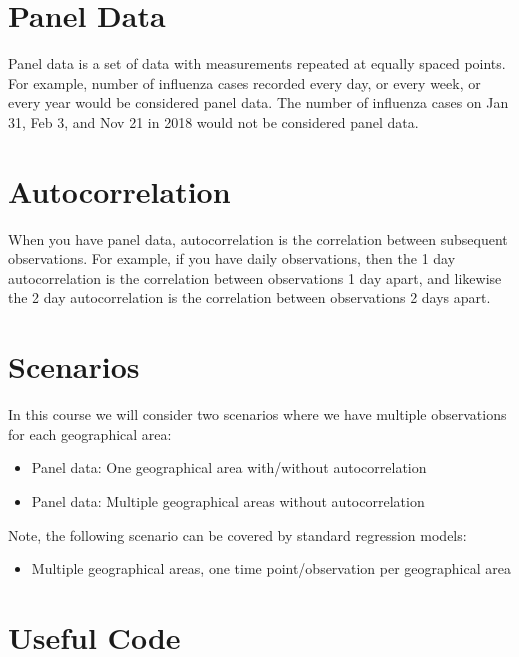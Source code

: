 \documentclass[]{book}
\providecommand{\tightlist}{%
  \setlength{\itemsep}{0pt}\setlength{\parskip}{0pt}}
\begin{document}
\section{Panel Data}\label{panel-data}

Panel data is a set of data with measurements repeated at equally spaced
points. For example, number of influenza cases recorded every day, or
every week, or every year would be considered panel data. The number of
influenza cases on Jan 31, Feb 3, and Nov 21 in 2018 would not be
considered panel data.

\section{Autocorrelation}\label{autocorrelation}

When you have panel data, autocorrelation is the correlation between
subsequent observations. For example, if you have daily observations,
then the 1 day autocorrelation is the correlation between observations 1
day apart, and likewise the 2 day autocorrelation is the correlation
between observations 2 days apart.

\section{Scenarios}\label{scenarios}

In this course we will consider two scenarios where we have multiple
observations for each geographical area:

\begin{itemize}
\tightlist
\item
  Panel data: One geographical area with/without autocorrelation
\item
  Panel data: Multiple geographical areas without autocorrelation
\end{itemize}

Note, the following scenario can be covered by standard regression
models:

\begin{itemize}
\tightlist
\item
  Multiple geographical areas, one time point/observation per
  geographical area
\end{itemize}

\section{Useful Code}\label{useful-code}
\end{document}
